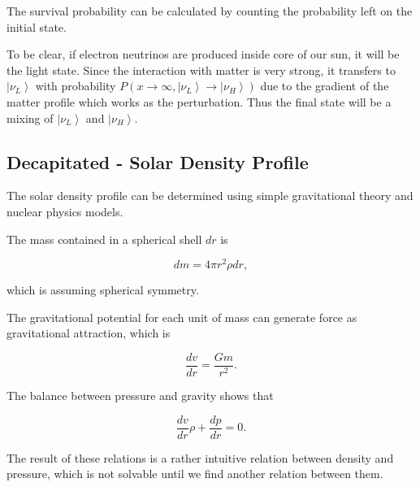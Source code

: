 \documentclass{tufte-handout}
\newcommand{\ket}[1]{\left| #1\right\rangle}
\begin{document}
The survival probability can be calculated by counting the probability left on the initial state.

To be clear, if electron neutrinos are produced inside core of our sun, it will be the light state. Since the interaction with matter is very strong, it transfers to $\ket{\nu_L}$ with probability $P(x\to \infty, \ket{\nu_L}\to\ket{\nu_H}) $ due to the gradient of the matter profile which works as the perturbation. Thus the final state will be a mixing of $\ket{\nu_L}$ and $\ket{\nu_H}$.


















\subsection{Decapitated - Solar Density Profile}



The solar density profile can be determined using simple gravitational theory and nuclear physics models.

The mass contained in a spherical shell $dr$ is

\begin{equation}
    dm = 4\pi r^2 \rho dr ,
\end{equation}

which is assuming spherical symmetry.

The gravitational potential for each unit of mass can generate force as gravitational attraction, which is

\begin{equation*}
    \frac{dv}{dr} = \frac{G m}{r^2}.
\end{equation*}

The balance between pressure and gravity shows that

\begin{equation*}
    \frac{dv}{dr} \rho + \frac{dp}{dr} = 0.
\end{equation*}

The result of these relations is a rather intuitive relation between density and pressure, which is not solvable until we find another relation between them.
\end{document}
